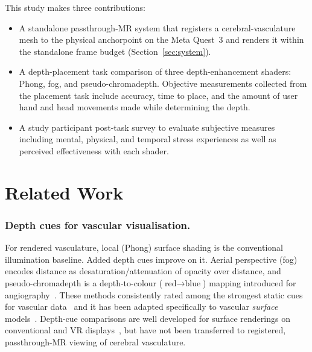 \documentclass[runningheads]{llncs}
\begin{document}
\noindent This study makes three contributions:
\begin{itemize}
  \item A standalone passthrough-MR system that registers a cerebral-vasculature mesh to the physical anchorpoint on the Meta Quest~3 and renders it within the standalone frame budget (Section~\ref{sec:system}).
  \item A depth-placement task comparison of three depth-enhancement shaders: Phong, fog, and pseudo-chromadepth. Objective measurements collected from the placement task include accuracy, time to place, and the amount of user hand and head movements made while determining the depth.
  \item A study participant post-task survey to evaluate subjective measures including mental, physical, and temporal stress experiences as well as perceived effectiveness with each shader. \end{itemize}

\section{Related Work}\label{sec:related}

\subsubsection{Depth cues for vascular visualisation.}
For rendered vasculature, local (Phong) surface shading is the conventional illumination baseline. Added depth cues improve on it. Aerial perspective (fog) encodes distance as desaturation/attenuation of opacity over distance, and pseudo-chromadepth is a depth-to-colour ($\text{red}\rightarrow\text{blue}$)
mapping introduced for angiography~\cite{ropinski_visually_2006}. These methods consistently rated among the
strongest static cues for vascular data~\cite{kersten-oertel_evaluation_2014} and it has been adapted
specifically to vascular \emph{surface} models~\cite{behrendt_combining_2017}. Depth-cue
comparisons are well developed for surface renderings on conventional and VR
displays~\cite{hombeck_evaluating_2022}, but have not been transferred to registered, passthrough-MR
viewing of cerebral vasculature.
\end{document}
